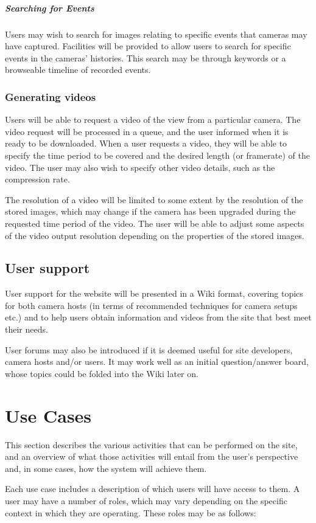 \documentclass[11pt]{article}
\begin{document}
\subparagraph{Searching for Events} Users may wish to search for images relating to specific events that cameras may have captured. Facilities will be provided to allow users to search for specific events in the cameras' histories. This search may be through keywords or a browseable timeline of recorded events.


\subsubsection{Generating videos}
\label{generate_video}
Users will be able to request a video of the view from a particular camera. The video request will be processed in a queue, and the user informed when it is ready to be downloaded. When a user requests a video, they will be able to specify the time period to be covered and the desired length (or framerate) of the video. The user may also wish to specify other video details, such as the compression rate.

The resolution of a video will be limited to some extent by the resolution of the stored images, which may change if the camera has been upgraded during the requested time period of the video. The user will be able to adjust some aspects of the video output resolution depending on the properties of the stored images.

\subsection{User support}
User support for the website will be presented in a Wiki format, covering topics for both camera hosts (in terms of recommended techniques for camera setups etc.) and to help users obtain information and videos from the site that best meet their needs.

User forums may also be introduced if it is deemed useful for site developers, camera hosts and/or users. It may work well as an initial question/answer board, whose topics could be folded into the Wiki later on.

\clearpage
\section{Use Cases}
\label{sec:use_cases}
This section describes the various activities that can be performed on the site, and an overview of what those activities will entail from the user's perspective and, in some cases, how the system will achieve them.

Each use case includes a description of which users will have access to them. A user may have a number of roles, which may vary depending on the specific context in which they are operating. These roles may be as follows:
\end{document}
